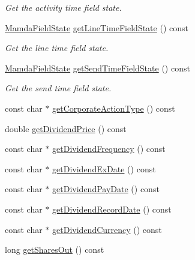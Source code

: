 \begin{CompactItemize}
\begin{CompactList}\small\item\em Get the activity time field state. \item\end{CompactList}\item 
\hyperlink{namespaceWombat_93aac974f2ab713554fd12a1fa3b7d2a}{Mamda\-Field\-State} \hyperlink{classWombat_1_1MamdaFundamentalListener_b5796fc4bfc42902dbe4c39b3f1640bb}{get\-Line\-Time\-Field\-State} () const 
\begin{CompactList}\small\item\em Get the line time field state. \item\end{CompactList}\item 
\hyperlink{namespaceWombat_93aac974f2ab713554fd12a1fa3b7d2a}{Mamda\-Field\-State} \hyperlink{classWombat_1_1MamdaFundamentalListener_e58cb36ab2dd46fc970fc2ddb3a91aaf}{get\-Send\-Time\-Field\-State} () const 
\begin{CompactList}\small\item\em Get the send time field state. \item\end{CompactList}\item 
const char $\ast$ \hyperlink{classWombat_1_1MamdaFundamentalListener_5413a673ec90c6b17a47309351d12c5b}{get\-Corporate\-Action\-Type} () const 
\item 
double \hyperlink{classWombat_1_1MamdaFundamentalListener_b0117a9604ee4b562794e2148c9d514e}{get\-Dividend\-Price} () const 
\item 
const char $\ast$ \hyperlink{classWombat_1_1MamdaFundamentalListener_233a245991d21d70fb6972091bb56c84}{get\-Dividend\-Frequency} () const 
\item 
const char $\ast$ \hyperlink{classWombat_1_1MamdaFundamentalListener_063a6648c273949792d6ebdf740ce956}{get\-Dividend\-Ex\-Date} () const 
\item 
const char $\ast$ \hyperlink{classWombat_1_1MamdaFundamentalListener_4f4c19ac596754914a59a2389eeac5bc}{get\-Dividend\-Pay\-Date} () const 
\item 
const char $\ast$ \hyperlink{classWombat_1_1MamdaFundamentalListener_da3a7f2c8e3800e187af0198f8a6ab1c}{get\-Dividend\-Record\-Date} () const 
\item 
const char $\ast$ \hyperlink{classWombat_1_1MamdaFundamentalListener_6ef9676f4d187e8cdb6e2211260b4768}{get\-Dividend\-Currency} () const 
\item 
long \hyperlink{classWombat_1_1MamdaFundamentalListener_39395ed6d7896ff0d5ac8594199fbdc7}{get\-Shares\-Out} () const 

\end{CompactItemize}
